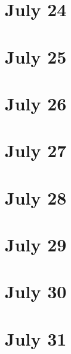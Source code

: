 \section{July 24}

\section{July 25}

\section{July 26}

\section{July 27}

\section{July 28}

\section{July 29}

\section{July 30}

\section{July 31}

